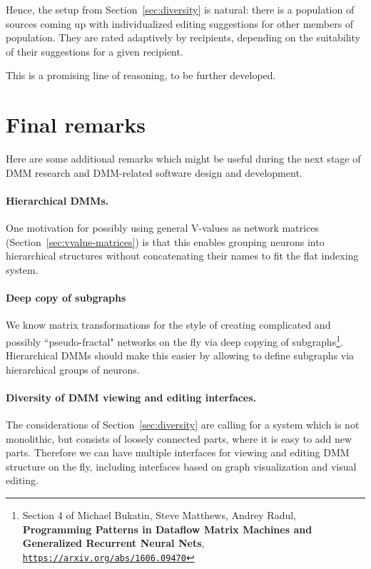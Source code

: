 \documentclass{article}
\begin{document}
Hence, the setup from Section~\ref{sec:diversity} is natural: there is a population of sources coming up with individualized editing suggestions
for other members of population. They are rated adaptively by recipients, depending on the suitability of their suggestions for
a given recipient.

This is a promising line of reasoning, to be further developed.

\section*{Final remarks}

Here are some additional remarks which might be useful during the next stage of DMM research and DMM-related software design and development.

\paragraph{Hierarchical DMMs.}
One motivation for possibly using general V-values as network matrices (Section~\ref{sec:vvalue-matrices}) is that this enables grouping neurons
into hierarchical structures without concatenating their names to fit the flat indexing system.

\paragraph{Deep copy of subgraphs}
We know matrix transformations for the style of creating complicated and possibly ``pseudo-fractal" networks on the fly via deep copying of 
subgraphs\footnote{Section 4 of Michael Bukatin, Steve Matthews, Andrey Radul, {\bf Programming Patterns in Dataflow Matrix Machines and Generalized Recurrent Neural Nets},
\href{https://arxiv.org/abs/1606.09470}{\tt https://arxiv.org/abs/1606.09470}}. Hierarchical DMMs should make this easier by allowing
to define subgraphs via hierarchical groups of neurons.

\paragraph{Diversity of DMM viewing and editing interfaces.} The considerations of Section~\ref{sec:diversity} are calling for a system
which is not monolithic, but consists of loosely connected parts, where it is easy to add new parts. Therefore we can have multiple interfaces
for viewing and editing DMM structure on the fly, including interfaces based on graph visualization and visual editing. 
\end{document}
